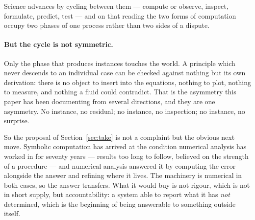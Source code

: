 \documentclass[11pt]{article}
\begin{document}
Science advances by cycling between them --- compute or observe, inspect, formulate, predict, test
--- and on that reading the two forms of computation occupy two phases of one process rather than two
sides of a dispute.

\paragraph{But the cycle is not symmetric.} Only the phase that produces instances touches the world.
A principle which never descends to an individual case can be checked against nothing but its own
derivation: there is no object to insert into the equations, nothing to plot, nothing to measure,
and nothing a fluid could contradict. That is the asymmetry this paper has been documenting from
several directions, and they are one asymmetry. No instance, no residual; no instance, no inspection;
no instance, no surprise.

So the proposal of Section~\ref{sec:take} is not a complaint but the obvious next move. Symbolic
computation has arrived at the condition numerical analysis has worked in for seventy years ---
results too long to follow, believed on the strength of a procedure --- and numerical analysis
answered it by computing the error alongside the answer and refining where it lives. The machinery is
numerical in both cases, so the answer transfers. What it would buy is not rigour, which is not in
short supply, but accountability: a system able to report what it has \emph{not} determined, which is
the beginning of being answerable to something outside itself.
\end{document}
